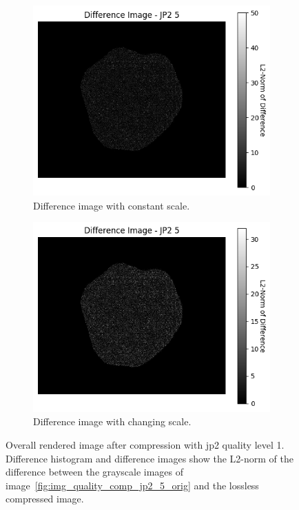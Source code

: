 \begin{figure}[htb]
\begin{subfigure}[b]{0.48\textwidth}
        \label{fig:img_quality_comp_jp2_5_histo}
    \end{subfigure}
    \\
    \begin{subfigure}[b]{0.48\textwidth}
        \centering
        \includegraphics[width=\textwidth]{doc/thesis/0_figures/compare_quality/set1/jp2_5_diff_heatmap.png}
        \caption{Difference image with constant scale.}
        \label{fig:img_quality_comp_jp2_5_diff}
    \end{subfigure}
    \begin{subfigure}[b]{0.48\textwidth}
        \centering
        \includegraphics[width=\textwidth]{doc/thesis/0_figures/compare_quality/set1/jp2_5_diff_heatmap_rel.png}
        \caption{Difference image with changing scale.}
        \label{fig:img_quality_comp_jp2_5_diff_rel}
    \end{subfigure}
    \caption{Overall rendered image after compression with \gls{jp2} quality level 1. Difference histogram and difference images show the L2-norm of the difference between the grayscale images of image~\ref{fig:img_quality_comp_jp2_5_orig} and the lossless compressed image.}
    \label{fig:img_quality_comp_jp2_5}
\end{figure}


